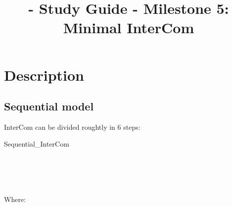 
\title{\TM - Study Guide - Milestone 5: Minimal InterCom}

\maketitle

\section{Description}

\subsection{Sequential model}

InterCom can be divided roughtly in 6 steps:

\begin{pseudocode}{Sequential\_InterCom}{~}
  \BEGIN
     \GETS {}\\
     \GETS {}\\
    \\
     \GETS {}\\
     \GETS {}\\
  \END
  \ENDPROCEDURE
\end{pseudocode}

Where:

